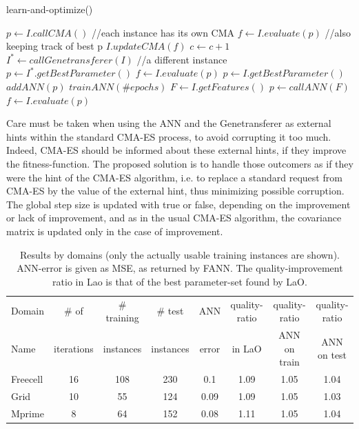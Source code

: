 \documentclass{MYsig-alternate}
\begin{document}
\vspace{-0.2cm}
\begin{algorithm}[h!]
\caption{learn-and-optimize()}
\label{algolao}
{\small
\begin{algorithmic}[1]
\STATE $p \gets I.callCMA()$ //each instance has its own CMA
\STATE $f \gets I.evaluate(p)$ //also keeping track of best p
\STATE $I.updateCMA(f)$
\ENDFOR
\STATE $c \gets c + 1$
\ENDFOR
{}
\STATE $I^* \gets callGenetransferer(I)$ //a different instance
\STATE $p \gets I^*.getBestParameter()$
\STATE $f \gets I.evaluate(p)$
\ENDFOR
{}
\STATE $p \gets I.getBestParameter()$
\STATE $addANN(p)$
\ENDFOR
\STATE $trainANN(\#epochs)$
\STATE $F \gets I.getFeatures()$
\STATE $p \gets callANN(F)$
\STATE $f \gets I.evaluate(p)$
\ENDFOR


\ENDWHILE
\RETURN{} 
\end{algorithmic}
}
\end{algorithm}
\vspace{-0.2cm}



Care must be taken when using the ANN and the Genetransferer as external hints within the standard CMA-ES process, to avoid corrupting it too much. Indeed, CMA-ES should be informed about these external hints, if they improve the fitness-function. The proposed solution is to handle those outcomers as if they were the hint of the CMA-ES algorithm, i.e. to replace a standard request from CMA-ES by the value of the external hint, thus minimizing possible corruption. The global step size is updated with true or false, depending on the improvement or lack of improvement, and as in the usual CMA-ES algorithm, the covariance matrix is updated only in the case of improvement.

\begin{table}[ht]
\centering
\begin{tabular}{l c c c c c c c}
\hline\hline
Domain & \# of & \# training & \# test &  ANN & quality-ratio & quality-ratio & quality-ratio \\ 
Name & iterations  & instances &  instances &  error & in LaO & ANN on train & ANN on test \\ 
\hline
Freecell& 16 & 108 & 230 & 0.1 & 1.09 & 1.05 & 1.04  \\
Grid & 10 & 55 & 124 & 0.09 & 1.09 & 1.05 & 1.03  \\
Mprime & 8 & 64 & 152 & 0.08 & 1.11 & 1.05 & 1.04   \\
\hline
\end{tabular}
\caption{Results by domains (only the actually usable training instances are shown). ANN-error is given as MSE, as returned by FANN. The quality-improvement ratio in Lao is that of the best parameter-set found by LaO.}
\label{table:domains}
\end{table} 
\end{document}
